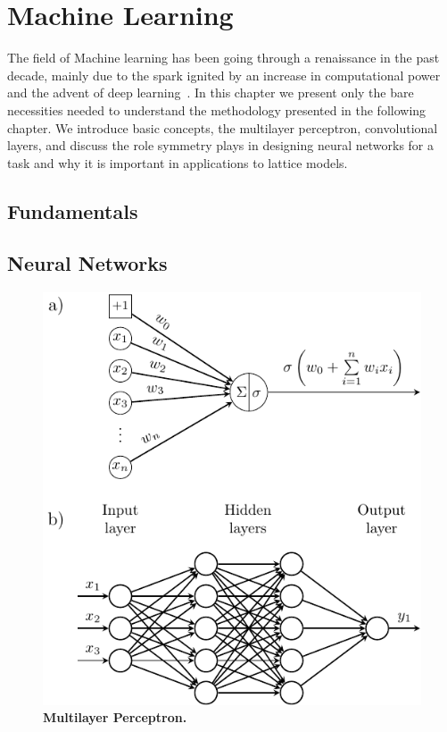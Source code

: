 \ifpdf
\graphicspath{{Chapter4/Figs/Raster/}{Chapter4/Figs/PDF/}{Chapter4/Figs/}}
\else
\graphicspath{{Chapter4/Figs/Vector/}{Chapter4/Figs/}}
\fi




\chapter{Machine Learning}
\label{chapter4}
The field of Machine learning has been going through a renaissance in the past decade, mainly due to the spark ignited by an increase in computational power and the advent of deep learning~\cite{goodfellow2016deep}. In this chapter we present only the bare necessities needed to understand the methodology presented in the following chapter. We introduce basic concepts, the multilayer perceptron, convolutional layers, and discuss the role symmetry plays in designing neural networks for a task and why it is important in applications to lattice models.  

\section{Fundamentals}

\section{Neural Networks}
\begin{figure}[h]
	\centering
	\includegraphics[width=0.7\linewidth]{Chapter4/Figs/Vector/mlp.pdf}
	\caption[Multilayer Perceptron]{\textbf{Multilayer Perceptron.}}
	\label{fig:mlp}
\end{figure}

